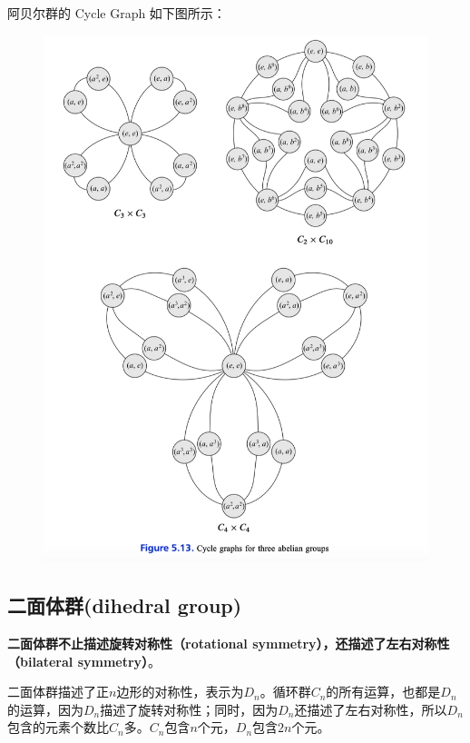\documentclass[12pt]{article}
\begin{document}
阿贝尔群的 Cycle Graph 如下图所示：
\begin{figure}[H]
    \centering
    \includegraphics[width=.5\textwidth]{fig/Group/CycleGraph-Abelian.png}
\end{figure}

\subsection{二面体群(dihedral group)}
\textbf{二面体群不止描述旋转对称性（rotational symmetry），还描述了\textbf{左右对称性（bilateral symmetry）}}。

二面体群描述了正$n$边形的对称性，表示为$D_n$。循环群$C_n$的所有运算，也都是$D_n$的运算，因为$D_n$描述了旋转对称性；同时，因为$D_n$还描述了左右对称性，所以$D_n$包含的元素个数比$C_n$多。$C_n$包含$n$个元，$D_n$包含$2n$个元。
\end{document}
